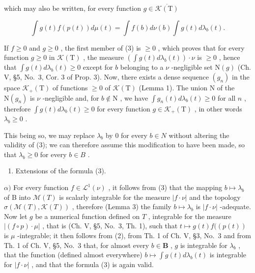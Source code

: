 which may also be written, for every function \(g \in \overline{\mathcal{K}(\mathrm{T})}\)

\[
\int g (t) f (p (t)) d \mu (t) = \int f (b) d \nu (b) \int g (t) d \lambda_ {b} (t).\tag{3}
\]

If \(f \geqslant 0\) and \(g \geqslant 0\) , the first member of (3) is \(\geqslant 0\) , which proves that for every function \(g \geqslant 0\) in \(\mathcal{K}(\mathrm{T})\) , the measure \(\left( \int g(t) d\lambda_b(t) \right) \cdot \nu\) is \(\geqslant 0\) , hence that \(\int g(t) d\lambda_b(t) \geqslant 0\) except for \(b\) belonging to a \(\nu\) -negligible set \(\mathrm{N}(g)\) (Ch. V, §5, No.~3, Cor. 3 of Prop. 3). Now, there exists a dense sequence \((g_n)\) in the space \(\mathcal{K}_+(\mathrm{T})\) of functions \(\geqslant 0\) of \(\mathcal{K}(\mathrm{T})\) (Lemma 1). The union \(\mathrm{N}\) of the \(\mathrm{N}(g_n)\) is \(\nu\) -negligible and, for \(b \notin \mathrm{N}\) , we have \(\int g_n(t) d\lambda_b(t) \geqslant 0\) for all \(n\) , therefore \(\int g(t) d\lambda_b(t) \geqslant 0\) for every function \(g \in \mathcal{K}_+(\mathrm{T})\) , in other words \(\lambda_b \geqslant 0\) .

This being so, we may replace \(\lambda_{b}\) by 0 for every \(b \in N\) without altering the validity of (3); we can therefore assume this modification to have been made, so that \(\lambda_{b} \geqslant 0\) for every \(b \in B\) .

\begin{enumerate}
\def\labelenumi{\arabic{enumi})}
\setcounter{enumi}{2}
\tightlist
\item
  Extensions of the formula (3).
\end{enumerate}

\(\alpha)\) For every function \(f \in \mathcal{L}^1(\nu)\) , it follows from (3) that the mapping \(b \mapsto \lambda_b\) of B into \(\mathcal{M}(T)\) is scalarly integrable for the measure \(|f \cdot \nu|\) and the topology \(\sigma(\mathcal{M}(T), \mathcal{K}(T))\) , therefore (Lemma 3) the family \(b \mapsto \lambda_b\) is \(|f \cdot \nu|\) -adequate. Now let \(g\) be a numerical function defined on \(T\) , integrable for the measure \(|(f \circ p) \cdot \mu|\) , that is (Ch. V, §5, No.~3, Th. 1), such that \(t \mapsto g(t)f((p(t))\) is \(\mu\) -integrable; it then follows from (2), from Th. 1 of Ch. V, §3, No.~3 and from Th. 1 of Ch. V, §5, No.~3 that, for almost every \(b \in \mathbf{B}\) , \(g\) is integrable for \(\lambda_b\) , that the function (defined almost everywhere) \(b \mapsto \int g(t)d\lambda_b(t)\) is integrable for \(|f \cdot \nu|\) , and that the formula (3) is again valid.


